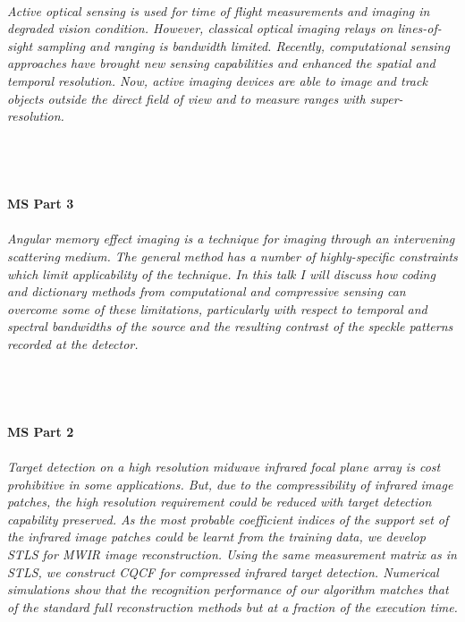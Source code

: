 \begin{multicols}{2}
\\  
    \textit{Active optical sensing is used for time of flight measurements and imaging in degraded vision condition. However, classical optical imaging relays on lines-of-sight sampling and ranging is bandwidth limited. Recently, computational sensing approaches have brought new sensing capabilities and enhanced the spatial and temporal resolution. Now, active imaging devices are able to image and track objects outside the direct field of view and to measure ranges with super-resolution. }\\
\\ 
    \\
    \\\\
    \noindent\textbf{MS Part 3}\\
\\  
    \textit{Angular memory effect imaging is a technique for imaging through an intervening scattering medium. The general method has a number of highly-specific constraints which limit applicability of the technique. In this talk I will discuss how coding and dictionary methods from computational and compressive sensing can overcome some of these limitations, particularly with respect to temporal and spectral bandwidths of the source and the resulting contrast of the speckle patterns recorded at the detector. }\\
\\ 
    \\
    \\\\
    \noindent\textbf{MS Part 2}\\
\\  
    \textit{Target detection on a high resolution midwave infrared focal plane array is cost prohibitive in some applications.  But, due to the compressibility of infrared image patches, the high resolution requirement could be reduced with target detection capability preserved. As the most probable coefficient indices of the support set of the infrared image patches could be learnt from the training data, we develop STLS for MWIR image reconstruction. Using the same measurement matrix as in STLS, we construct CQCF for compressed infrared target detection. Numerical simulations show that the recognition performance of our algorithm matches that of the standard full reconstruction methods but at a fraction of the execution time.}\\

\end{multicols}
